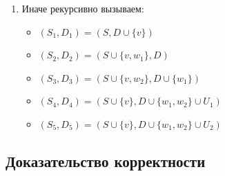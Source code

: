 \begin{enumerate}[label=\Alph*]
\begin{enumerate}
        \begin{itemize}
            \item \((S_1, D_1) = (S, D \cup \{v\})\)
            \item \((S_2, D_2) = (S \cup \{v, w_1\}, D)\)
            \item \((S_3, D_3) = (S \cup \{v, w_2\}, D \cup \{w_1\})\)
            \item \((S_4, D_4) = (S \cup \{v\}, D \cup \{w_1, w_2\} \cup U_1 \cup U_2)\)
        \end{itemize}
        \item Иначе рекурсивно вызываем:
        \begin{itemize}
            \item \((S_1, D_1) = (S, D \cup \{v\})\)
            \item \((S_2, D_2) = (S \cup \{v, w_1\}, D)\)
            \item \((S_3, D_3) = (S \cup \{v, w_2\}, D \cup \{w_1\})\)
            \item \((S_4, D_4) = (S \cup \{v\}, D \cup \{w_1, w_2\} \cup U_1)\)
            \item \((S_5, D_5) = (S \cup \{v\}, D \cup \{w_1, w_2\} \cup U_2)\)
        \end{itemize}
    \end{enumerate}
\end{enumerate}

\subsection{Доказательство корректности}

